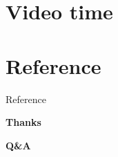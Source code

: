 \documentclass[aspectratio=169]{beamer}
\begin{document}
\section{Video time}

\section{Reference}

\begin{frame}[allowframebreaks]{Reference}

   \printbibliography[heading=none]
 
\end{frame}

\begin{frame}{}
  \textbf{Thanks}

  \textbf{Q\&A}
\end{frame}
\end{document}
